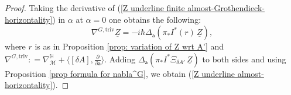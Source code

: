 \documentclass[11pt,a4paper]{amsart}
\theoremstyle{plain} %
\theoremstyle{definition}
\theoremstyle{remark}
\newcommand{\mr}{\mathrm}
\newcommand{\sfa}{\mathsf{a}}
\newcommand{\M}{\mathcal{M}}
\newcommand{\ul}{\underline}
\begin{document}
\begin{proof}
    Taking the derivative of (\ref{Z underline finite almost-Grothendieck-horizontality}) in $\alpha$ at $\alpha=0$ one obtains the following:
    \begin{equation}
        \nabla^{G,\mr{triv}}\ul{Z}= -i\hbar\Delta_\sfa( %
        \pi_*I^*(r)\,
        \ul{Z}),
    \end{equation}
    where $r$ is as in Proposition \ref{prop: variation of Z wrt A'} and $\nabla^{G,\mr{triv}}\colon=\nabla^{\mathbb{H}}_\M+\langle [\delta A],\frac{\partial}{\partial \sfa}\rangle$. Adding 
    $%
    \Delta_\sfa (
\pi_* I^* \Xi_{\delta A'}\, \ul{Z})$ to both sides and using Proposition \ref{prop formula for nabla^G}, we obtain (\ref{Z underline almost-horizontality}).
\end{proof}
\end{document}
